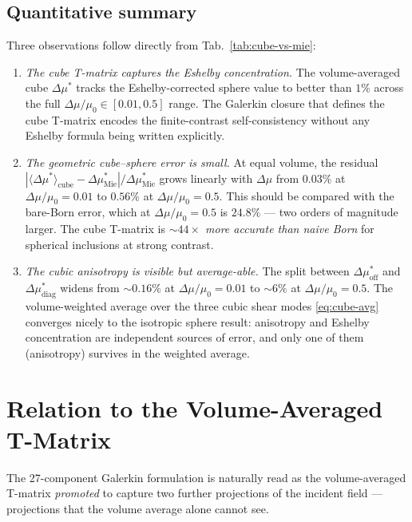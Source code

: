 \documentclass[11pt,a4paper]{article}
\newcommand{\D}{\Delta}
\newcommand{\Mie}{\mathrm{Mie}}
\begin{document}
\subsection{Quantitative summary}

Three observations follow directly from Tab.~\ref{tab:cube-vs-mie}:

\begin{enumerate}[leftmargin=*]
\item\emph{The cube T-matrix captures the Eshelby concentration.}  The
volume-averaged cube $\D\mu^*$ tracks the Eshelby-corrected sphere
value to better than $1\%$ across the full $\D\mu/\mu_0\in[0.01,0.5]$
range.  The Galerkin closure that defines the cube T-matrix encodes the
finite-contrast self-consistency without any Eshelby formula being
written explicitly.

\item\emph{The geometric cube--sphere error is small.}  At equal volume,
the residual $|\langle\D\mu^*\rangle_{\mathrm{cube}} -
\D\mu^*_{\Mie}|/\D\mu^*_{\Mie}$ grows linearly with $\D\mu$ from
$0.03\%$ at $\D\mu/\mu_0=0.01$ to $0.56\%$ at $\D\mu/\mu_0=0.5$.  This
should be compared with the bare-Born error, which at $\D\mu/\mu_0=0.5$
is $24.8\%$ --- two orders of magnitude larger.  The cube T-matrix is
\emph{$\sim 44\times$ more accurate than naive Born} for spherical
inclusions at strong contrast.

\item\emph{The cubic anisotropy is visible but average-able.}  The
split between $\D\mu^*_{\mathrm{off}}$ and $\D\mu^*_{\mathrm{diag}}$
widens from $\sim 0.16\%$ at $\D\mu/\mu_0=0.01$ to $\sim 6\%$ at
$\D\mu/\mu_0=0.5$.  The volume-weighted average over the three cubic
shear modes \eqref{eq:cube-avg} converges nicely to the isotropic
sphere result: anisotropy and Eshelby concentration are independent
sources of error, and only one of them (anisotropy) survives in the
weighted average.
\end{enumerate}

\section{Relation to the Volume-Averaged T-Matrix}
\label{sec:vol-avg}

The 27-component Galerkin formulation is naturally read as the
volume-averaged T-matrix \emph{promoted} to capture two further
projections of the incident field --- projections that the volume
average alone cannot see.
\end{document}
